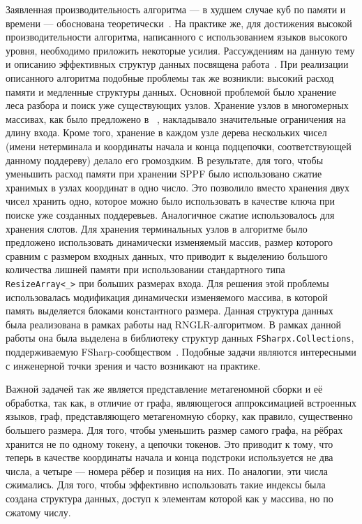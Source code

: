Заявленная производительность алгоритма --- в худшем случае куб по памяти и времени --- обоснована теоретически~\cite{Johnstone201564}. На практике же, для достижения высокой производительности алгоритма, написанного с использованием языков высокого уровня, необходимо приложить некоторые усилия. Рассуждениям на данную тему и описанию эффективных структур данных посвящена работа~\cite{Johnstone2011}. При реализации описанного алгоритма подобные проблемы так же возникли: высокий расход памяти и медленные структуры данных. Основной проблемой было хранение леса разбора и поиск уже существующих узлов. Хранение узлов в многомерных массивах, как было предложено в ~\cite{Johnstone2011}, накладывало значительные ограничения на длину входа. Кроме того, хранение в каждом узле дерева нескольких чисел (имени нетерминала и координаты начала и конца подцепочки, соответствующей данному поддереву) делало его громоздким. В результате, для того, чтобы уменьшить расход памяти при хранении SPPF было использовано сжатие хранимых в узлах координат в одно число. Это позволило вместо хранения двух чисел хранить одно, которое можно было использовать в качестве ключа при поиске уже созданных поддеревьев. Аналогичное сжатие использовалось для хранения слотов. Для хранения терминальных узлов в алгоритме было предложено использовать динамически изменяемый массив,  размер которого сравним с размером входных данных, что приводит к выделению большого количества лишней памяти при использовании стандартного типа \verb|ResizeArray<_>| при больших размерах входа. Для решения этой проблемы использовалась модификация динамически изменяемого массива, в которой память выделяется блоками константного размера. Данная структура данных была реализована в рамках работы над RNGLR-алгоритмом. В рамках данной работы она была выделена в библиотеку структур данных \texttt{FSharpx.Collections}, поддерживаемую FSharp-сообществом~\cite{FsharpX}. Подобные задачи являются интересными с инженерной точки зрения и часто возникают на практике.

Важной задачей так же является представление метагеномной сборки и её обработка, так как, в отличие от графа, являющегося аппроксимацией встроенных языков, граф, представляющего метагеномную сборку, как правило, существенно большего размера. Для того, чтобы уменьшить размер самого графа, на рёбрах хранится не по одному токену, а цепочки токенов. Это приводит к тому, что теперь в качестве координаты начала и конца подстроки используется не два числа, а четыре --- номера рёбер и позиция на них. По аналогии, эти числа сжимались. Для того, чтобы эффективно использовать такие индексы была создана структура данных, доступ к элементам которой как у массива, но по сжатому числу. 

